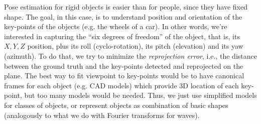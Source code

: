 Pose estimation for rigid objects is easier than for people, since they have fixed shape. The goal, in this case, is to understand position and orientation of the key-points of the objects (e.g. the wheels of a car). In other words, we're interested in capturing the ``six degrees of freedom'' of the object, that is, its $X,Y,Z$ position, plus its roll (cyclo-rotation), its pitch (elevation) and its yaw (azimuth). To do that, we try to minimize the \textit{reprojection error}, i.e., the distance between the ground truth and the key-points detected and reprojected on the plane. The best way to fit viewpoint to key-points would be to have canonical frames for each object (e.g. CAD models) which provide 3D location of each key-point, but too many models would be needed. Thus, we just use simplified models for classes of objects, or represent objects as combination of basic shapes (analogously to what we do with Fourier transforms for waves).
